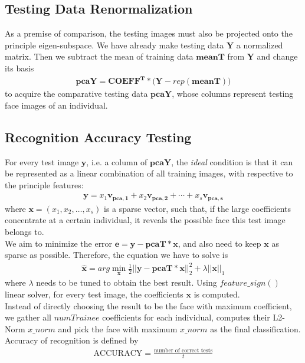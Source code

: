 \documentclass[10pt,journal]{IEEEtran}
\renewcommand{\[}{\begin{equation*} \begin{aligned}} %
\renewcommand{\]}{\end{aligned} \end{equation*}}
\begin{document}
\subsection{\large Testing Data Renormalization}
As a premise of comparison, the testing images must also be projected onto the principle eigen-subspace. We have already make testing data $\mathbf{Y}$ a normalized matrix. Then we subtract the mean of training data $\mathbf{meanT}$ from $\mathbf{Y}$ and change its basis
\[
	\mathbf{pcaY = COEFF^T * (Y} - rep(\mathbf{meanT}))
\]
to acquire the comparative testing data $\mathbf{pcaY}$, whose columns represent testing face images of an individual.

\subsection{\large Recognition Accuracy Testing}
For every test image $\mathbf{y}$, i.e. a column of $\mathbf{pcaY}$, the \textit{ideal} condition is that it can be represented as a linear combination of all training images, with respective to the principle features:
\[
 	\mathbf{y} = x_1 \mathbf{v_{pca, 1}} + x_2 \mathbf{v_{pca, 2}} + \cdots + x_s \mathbf{v_{pca, s}}
\]
where $\mathbf{x} = (x_1, x_2, \dots , x_s)$ is a sparse vector, such that, if the large coefficients concentrate at a certain individual, it reveals the possible face this test image belongs to. \\

We aim to minimize the error $\mathbf{e = y - pcaT * x}$, and also need to keep $\mathbf{x}$ as sparse as possible. Therefore, the equation we have to solve is
\[
	\hat{\mathbf{x}} = arg \min_{\mathbf{x}} \frac{1}{2} ||\mathbf{y - pcaT * x}||_2^2 + \lambda ||\mathbf{x}||_1
\]
where $\lambda$ needs to be tuned to obtain the best result. Using $feature\_sign()$ linear solver, for every test image, the coefficients $\mathbf{x}$ is computed. \\

Instead of directly choosing the result to be the face with maximum coefficient, we gather all $numTrainee$ coefficients for each individual, computes their L2-Norm $x\_norm$ and pick the face with maximum $x\_norm$ as the final classification. Accuracy of recognition is defined by
\[
	\text{ACCURACY} = \frac{\text{number of correct tests}}{t}
\]

\end{document}
